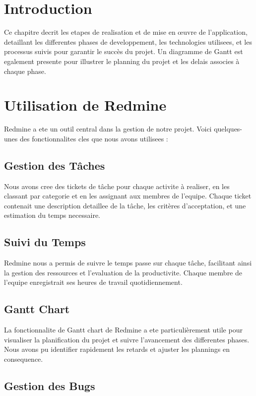 \documentclass[a4paper, 11pt, openany]{report}
\begin{document}
\section{Introduction}
Ce chapitre decrit les etapes de realisation et de mise en œuvre de l'application, detaillant les differentes phases de developpement, les technologies utilisees, et les processus suivis pour garantir le succès du projet. Un diagramme de Gantt est egalement presente pour illustrer le planning du projet et les delais associes à chaque phase.


\section{Utilisation de Redmine}

Redmine a ete un outil central dans la gestion de notre projet. Voici quelques-unes des fonctionnalites cles que nous avons utilisees :

\subsection{Gestion des Tâches}

Nous avons cree des tickets de tâche pour chaque activite à realiser, en les classant par categorie et en les assignant aux membres de l'equipe. Chaque ticket contenait une description detaillee de la tâche, les critères d'acceptation, et une estimation du temps necessaire.

\subsection{Suivi du Temps}

Redmine nous a permis de suivre le temps passe sur chaque tâche, facilitant ainsi la gestion des ressources et l'evaluation de la productivite. Chaque membre de l'equipe enregistrait ses heures de travail quotidiennement.

\subsection{Gantt Chart}

La fonctionnalite de Gantt chart de Redmine a ete particulièrement utile pour visualiser la planification du projet et suivre l'avancement des differentes phases. Nous avons pu identifier rapidement les retards et ajuster les plannings en consequence.

\subsection{Gestion des Bugs}
\end{document}

